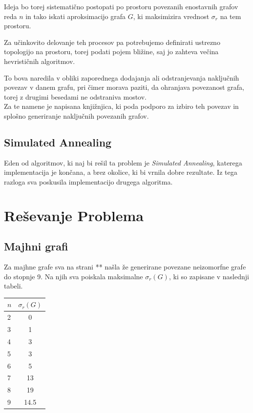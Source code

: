 \documentclass[ letterpaper, titlepage, fleqn]{article}
\begin{document}
Ideja bo torej sistematično postopati po prostoru povezanih enostavnih grafov reda $n$ in 
tako iskati aproksimacijo grafa $G$, ki maksimizira vrednost $\sigma_r$ na tem prostoru.

Za učinkovito delovanje teh procesov pa potrebujemo definirati ustrezno topologijo 
na prostoru, torej podati pojem bližine, saj jo zahteva večina hevrističnih algoritmov.

To bova naredila v obliki zaporednega dodajanja ali odstranjevanja naključnih povezav v 
danem grafu, pri čimer morava paziti, da ohranjava povezanost grafa, 
torej z drugimi besedami ne odstraniva mostov.\\
Za te namene je napisana knjižnjica, ki poda podporo za izbiro teh povezav
in splošno generiranje naključnih povezanih grafov.

\subsection{Simulated Annealing}
Eden od algoritmov, ki naj bi rešil ta problem je {\em Simulated Annealing}, 
katerega implementacija je končana, a brez okolice, ki bi vrnila dobre rezultate.
Iz tega razloga sva poskusila implementacijo drugega algoritma.

\section{Reševanje Problema}

\subsection{Majhni grafi}
Za majhne grafe sva na strani ** našla že generirane povezane neizomorfne grafe do stopnje 9.
Na njih sva poiskala maksimalne $\sigma_r(G)$, ki so zapisane v naslednji tabeli.

\begin{center}
    \begin{tabular}{|  l | c | }
      \hline
      $n$ & $\sigma_r(G)$ \\ \hline
      2 & 0 \\ 
      3 & 1 \\ 
      4 & 3 \\ 
      5 & 3 \\ 
      6 & 5 \\ 
      7 & 13 \\ 
      8 & 19 \\ 
      9 & 14.5 \\ 
      \hline
    \end{tabular}
\end{center}
\end{document}
